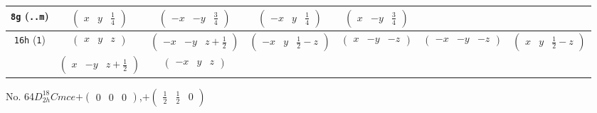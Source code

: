 \documentclass[fleqn,9pt,landscape]{jsarticle}
\begin{document}
\begin{center}
\begin{longtable}{ccccccc}
{\tt 8g} ({\tt ..m}) & $ \begin{pmatrix} x & y & \frac{1}{4} \end{pmatrix} $ & $ \begin{pmatrix} - x & - y & \frac{3}{4} \end{pmatrix} $ & $ \begin{pmatrix} - x & y & \frac{1}{4} \end{pmatrix} $ & $ \begin{pmatrix} x & - y & \frac{3}{4} \end{pmatrix} $ & $  $ & $  $ \\ \hline
{\tt 16h} ({\tt 1}) & $ \begin{pmatrix} x & y & z \end{pmatrix} $ & $ \begin{pmatrix} - x & - y & z + \frac{1}{2} \end{pmatrix} $ & $ \begin{pmatrix} - x & y & \frac{1}{2} - z \end{pmatrix} $ & $ \begin{pmatrix} x & - y & - z \end{pmatrix} $ & $ \begin{pmatrix} - x & - y & - z \end{pmatrix} $ & $ \begin{pmatrix} x & y & \frac{1}{2} - z \end{pmatrix} $ \\
& $ \begin{pmatrix} x & - y & z + \frac{1}{2} \end{pmatrix} $ & $ \begin{pmatrix} - x & y & z \end{pmatrix} $ & $  $ & $  $ & $  $ & $  $ \\
\end{longtable}
\end{center}
\newpage
No. 64\quad$D_{2h}^{18}$\quad$Cmce$\quad[ orthorhombic ]\quad$+\begin{pmatrix} 0 & 0 & 0 \end{pmatrix}$,\quad $+\begin{pmatrix} \frac{1}{2} & \frac{1}{2} & 0 \end{pmatrix}$
\end{document}
